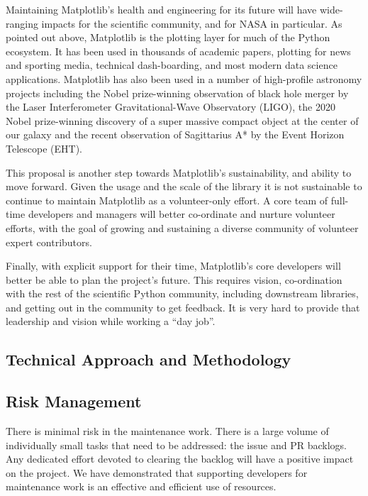\documentclass[12pt]{article}
\numberwithin{page}{section}
\begin{document}
Maintaining Matplotlib's health and engineering for its future will
have wide-ranging impacts for the scientific community, and for NASA in
particular.  As pointed out above, Matplotlib is the plotting layer
for much of the Python ecosystem.  It has been used in thousands of
academic papers, plotting for news and sporting media, technical
dash-boarding, and most modern data science applications.
Matplotlib has also been used in a number
of high-profile astronomy projects including the Nobel prize-winning
observation of black hole merger by the Laser Interferometer
Gravitational-Wave Observatory (LIGO), the 2020 Nobel prize-winning
discovery of a super massive compact object at the center of our
galaxy and the recent observation of Sagittarius A* by the Event
Horizon Telescope (EHT).

This proposal is another step towards Matplotlib's sustainability, and
ability to move forward. Given the usage and the scale of the library
it is not sustainable to continue to maintain Matplotlib as a
volunteer-only effort.  A core team of full-time developers and
managers will better co-ordinate and nurture volunteer efforts, with
the goal of growing and sustaining a diverse community of volunteer
expert contributors.

Finally, with explicit support for their time, Matplotlib's core developers
will better be able to plan the project's future.
This requires vision, co-ordination with the rest of the scientific
Python community, including downstream libraries, and getting out in
the community to get feedback.  It is very hard to provide that
leadership and vision while working a ``day job''.

\subsection{Technical Approach and Methodology}

\subsection{Risk Management}

There is minimal risk in the maintenance work.  There is a large volume
of individually small tasks that need to be addressed: the issue and
PR backlogs.  Any dedicated effort devoted to clearing the backlog
will have a positive impact on the project.  We have demonstrated that
supporting developers for maintenance work is an effective and
efficient use of resources.
\end{document}
